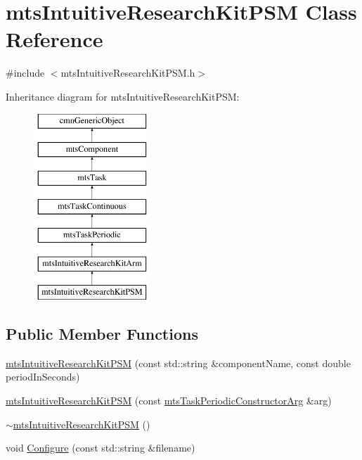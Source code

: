 \hypertarget{classmts_intuitive_research_kit_p_s_m}{}\section{mts\+Intuitive\+Research\+Kit\+P\+S\+M Class Reference}
\label{classmts_intuitive_research_kit_p_s_m}


{\ttfamily \#include $<$mts\+Intuitive\+Research\+Kit\+P\+S\+M.\+h$>$}

Inheritance diagram for mts\+Intuitive\+Research\+Kit\+P\+S\+M\+:\begin{figure}[H]
\begin{center}
\leavevmode
\includegraphics[height=7.000000cm]{df/d79/classmts_intuitive_research_kit_p_s_m}
\end{center}
\end{figure}
\subsection*{Public Member Functions}
\begin{DoxyCompactItemize}
\item 
\hyperlink{classmts_intuitive_research_kit_p_s_m_abef5e73e7971661533b1c3c35a7daae7}{mts\+Intuitive\+Research\+Kit\+P\+S\+M} (const std\+::string \&component\+Name, const double period\+In\+Seconds)
\item 
\hyperlink{classmts_intuitive_research_kit_p_s_m_abdb3056c2b2bfda1c686969feba67809}{mts\+Intuitive\+Research\+Kit\+P\+S\+M} (const \hyperlink{classmts_task_periodic_constructor_arg}{mts\+Task\+Periodic\+Constructor\+Arg} \&arg)
\item 
\hyperlink{classmts_intuitive_research_kit_p_s_m_a06c160ea5e424740296d597fab60ad36}{$\sim$mts\+Intuitive\+Research\+Kit\+P\+S\+M} ()
\item 
void \hyperlink{classmts_intuitive_research_kit_p_s_m_a91fa93ae27dc0d525e7fac2afbe1ff95}{Configure} (const std\+::string \&filename)
\end{DoxyCompactItemize}
